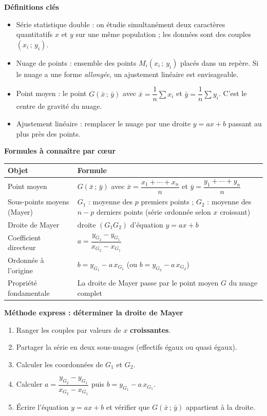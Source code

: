 \documentclass[11pt]{article}
\newcommand{\cle}[1]{{\popxbold\color{popdark}#1}}
\begin{document}
\begin{bilan}
\textbf{Définitions clés}
\begin{itemize}
  \item \cle{Série statistique double} : on étudie simultanément deux caractères quantitatifs $x$ et $y$ sur une même population ; les données sont des couples $(x_i\,;\,y_i)$.
  \item \cle{Nuage de points} : ensemble des points $M_i(x_i\,;\,y_i)$ placés dans un repère. Si le nuage a une forme \emph{allongée}, un ajustement linéaire est envisageable.
  \item \cle{Point moyen} : le point $G(\bar x\,;\,\bar y)$ avec $\bar x=\dfrac{1}{n}\sum x_i$ et $\bar y=\dfrac{1}{n}\sum y_i$. C'est le \og centre de gravité \fg{} du nuage.
  \item \cle{Ajustement linéaire} : remplacer le nuage par une droite $y=ax+b$ passant \og au plus près \fg{} des points.
\end{itemize}

\textbf{Formules à connaître par c\oe ur}
\begin{center}
\begin{tabularx}{\linewidth}{|l|X|}\hline
\rowcolor{popblueL} \textbf{Objet} & \textbf{Formule} \\ \hline
Point moyen & $G\left(\bar x\,;\,\bar y\right)$ avec $\bar x=\dfrac{x_1+\cdots+x_n}{n}$ et $\bar y=\dfrac{y_1+\cdots+y_n}{n}$ \\ \hline
Sous-points moyens (Mayer) & $G_1$ : moyenne des $p$ premiers points ; $G_2$ : moyenne des $n-p$ derniers points (série ordonnée selon $x$ croissant) \\ \hline
Droite de Mayer & droite $(G_1G_2)$ d'équation $y=ax+b$ \\ \hline
Coefficient directeur & $a=\dfrac{y_{G_2}-y_{G_1}}{x_{G_2}-x_{G_1}}$ \\ \hline
Ordonnée à l'origine & $b=y_{G_1}-a\,x_{G_1}$ \quad (ou $b=y_{G_2}-a\,x_{G_2}$) \\ \hline
Propriété fondamentale & La droite de Mayer passe par le point moyen $G$ du nuage complet \\ \hline
\end{tabularx}
\end{center}

\textbf{Méthode express : déterminer la droite de Mayer}
\begin{enumerate}
  \item Ranger les couples par valeurs de $x$ \textbf{croissantes}.
  \item Partager la série en deux sous-nuages (effectifs égaux ou quasi égaux).
  \item Calculer les coordonnées de $G_1$ et $G_2$.
  \item Calculer $a=\dfrac{y_{G_2}-y_{G_1}}{x_{G_2}-x_{G_1}}$ puis $b=y_{G_1}-a\,x_{G_1}$.
  \item Écrire l'équation $y=ax+b$ et vérifier que $G(\bar x\,;\,\bar y)$ appartient à la droite.
\end{enumerate}


\end{bilan}
\end{document}
